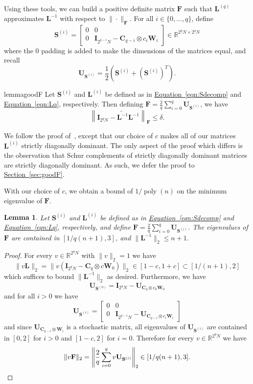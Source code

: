 \documentclass[11pt]{article}
\numberwithin{equation}{section}
\newtheorem{lemma}[theorem]{Lemma}
\theoremstyle{definition}
\theoremstyle{plain}
\newcommand{\R}{\mathbb R}
\newcommand{\expref}[2]{\hyperref[#2]{#1~\ref{#2}}}
\newcommand{\expeqref}[2]{\hyperref[#2]{#1~\eqref{#2}}}
\newcommand{\mC}{\mathbf{C}}
\newcommand{\mU}{\mathbf{U}}
\newcommand{\mS}{\mathbf{S}}
\newcommand{\mF}{\mathbf{F}}
\newcommand{\mW}{\mathbf{W}}
\newcommand{\mL}{\mathbf{L}}
\newcommand{\I}{\mathbf{I}}
\newcommand{\sym}[1][ ]{\mU_{#1}}
\newcommand{\lbar}{\left\|}
\newcommand{\rbar}{\right\|}
\newcommand{\poly}{\operatorname{poly}}
\newcommand{\Lt}{\widetilde{\mathbf{L}^{-1}}}
\newcommand{\Lq}{\mathbf{L}^{(q)}}
\begin{document}
Using these tools, we can build a positive definite matrix $\mF$ such that $\Lq$ approximates $\mL^{-1}$ with respect to $\|\cdot\|_{\mF}$.
For all $i\in \{0,\ldots,q\}$, define 
\begin{equation}
    \mS^{(i)}=\begin{bmatrix}0 & 0\\ 0 & \I_{2^{q-i}N}-\mC_{q-i}\otimes c_{i}\mW_i \end{bmatrix} \in \R^{2^qN\times 2^qN}\label{eqn:Sdecomp}
\end{equation}
where the $0$ padding is added to make the dimensions of the matrices equal, and recall
\[\sym[\mS^{(i)}] = \frac{1}{2}\left(\mS^{(i)}+(\mS^{(i)})^T\right).\]

\begin{restatable}{lemma}{goodF}\label{lem:goodF}
Let $\mS^{(i)}$ and $\mL^{(i)}$ be defined as in \expeqref{Equation}{eqn:Sdecomp} and \expeqref{Equation}{eqn:Lq}, respectively. %
Then defining
$\mF=\frac{2}{q}\sum_{i=0}^q\sym[\mS^{(i)}]$, we have %
$$\lbar \I_{2^qN}-\Lt\mL^{-1}\rbar_\mF\leq \delta.$$
\end{restatable}
We follow the proof of~\cite{AhmadinejadKeMuPeSiVa19}, except that our choice of $c$ makes all of our matrices $\mL^{(i)}$ %
strictly diagonally dominant. The only aspect of the proof which differs is the observation that Schur complements of strictly diagonally dominant matrices are strictly diagonally dominant. As such, we defer the proof to \expref{Section}{sec:goodF}.

With our choice of $c$, we obtain a bound of $1/\poly(n)$ on the minimum eigenvalue of $\mF$.
\begin{lemma}\label{lem:condF}
Let $\mS^{(i)}$ and $\mL^{(i)}$ be defined as in \expeqref{Equation}{eqn:Sdecomp} and \expeqref{Equation}{eqn:Lq}, respectively, %
and define
$\mF=\frac{2}{q}\sum_{i=0}^q\sym[\mS^{(i)}]$. The eigenvalues of $\mF$ are contained in $[1/q(n+1),3]$, and $\|\mL^{-1}\|_2\leq n+1$.
\end{lemma}
\begin{proof}
For every $v \in \R^{2^qN}$ with $\|v\|_2=1$ we have  
\[\|v\mL\|_2=\|v(\I_{2^qN}- \mC_q\otimes c\mW_0)\|_2 \in [1-c,1+c]\subset[1/(n+1),2]\]
which suffices to bound $\|\mL^{-1}\|_2$ as desired. Furthermore, we have
\[\sym[\mS^{(0)}]=\I_{2^{q}N}-\sym[\mC_{q}\otimes c_{0}\mW_0]\]
and for all $i>0$ we have
\[\sym[\mS^{(i)}]=\begin{bmatrix}0 & 0\\ 0 & \I_{2^{q-i}N}-\sym[\mC_{q-i}\otimes c_{i}\mW_i] \end{bmatrix}\]
and since $\sym[\mC_{q-i}\otimes \mW_i]$ is a stochastic matrix, all eigenvalues of $\sym[\mS^{(i)}]$ are contained in $[0,2]$ for $i>0$ and $[1-c,2]$ for $i=0$. Therefore for every $v\in \R^{2^qN}$ we have
\[\|v\mF\|_2=\left\|\frac{2}{q}\sum_{i=0}^q v\sym[\mS^{(i)}]\right\|_2 \in [1/q(n+1),3]. \qedhere\] 
\end{proof}
\end{document}
